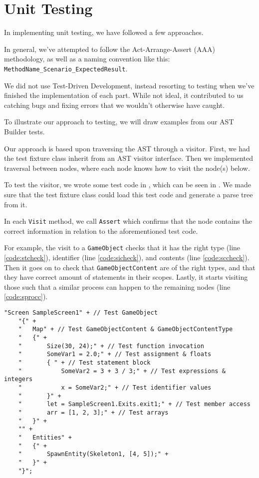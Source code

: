 \section{Unit Testing}
In implementing unit testing, we have followed a few approaches.

In general, we've attempted to follow the Act-Arrange-Assert (AAA)
methodology, as well as a naming convention like this:
\texttt{MethodName\_Scenario\_ExpectedResult}.

We did not use Test-Driven Development, instead resorting to testing
when we've finished the implementation of each part. While not ideal, it
contributed to us catching bugs and fixing errors that we wouldn't
otherwise have caught.

To illustrate our approach to testing, we will draw examples from our
AST Builder tests.

Our approach is based upon traversing the AST through a visitor. First,
we had the test fixture class inherit from an AST visitor interface.
Then we implemented traversal between nodes, where each node knows how
to visit the node(s) below.

To test the visitor, we wrote some test code in \dazel{}, which can be seen in . We made sure that
the test fixture class could load this test code and generate a parse
tree from it.

In each \texttt{Visit} method, we call \texttt{Assert} which confirms
that the node contains the correct information in relation to the
aforementioned test code.

For example, the visit to a \texttt{GameObject} checks that it has the
right type (line \ref{code:stcheck}), identifier (line \ref{code:sicheck}), and contents (line \ref{code:sccheck}). Then it goes on to check that
\texttt{GameObjectContent} are of the right types, and that they have
correct amount of statements in their scopes. Lastly, it starts visiting
those such that a similar process can happen to the remaining nodes (line \ref{code:sprocc}).

\begin{lstlisting}[caption={AST Builder \dazel{} test code}, label={lst:asttestcode}]
    "Screen SampleScreen1" + // Test GameObject
    "{" +
    "   Map" + // Test GameObjectContent & GameObjectContentType
    "   {" +
    "       Size(30, 24);" + // Test function invocation
    "       SomeVar1 = 2.0;" + // Test assignment & floats
    "       { " + // Test statement block
    "           SomeVar2 = 3 + 3 / 3;" + // Test expressions & integers
    "           x = SomeVar2;" + // Test identifier values
    "       }" +
    "       let = SampleScreen1.Exits.exit1;" + // Test member access 
    "       arr = [1, 2, 3];" + // Test arrays
    "   }" +
    "" +
    "   Entities" +
    "   {" +
    "       SpawnEntity(Skeleton1, [4, 5]);" +
    "   }" +
    "}";
    \end{lstlisting}


